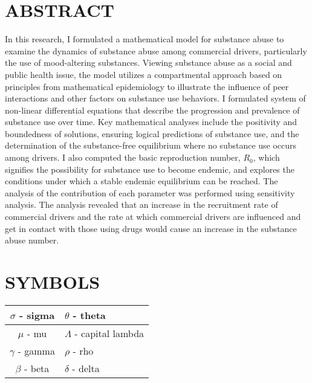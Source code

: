 \documentclass[12pt]{report}
\begin{document}
	
	
	\newpage
	
	\tableofcontents
	\section*{ABSTRACT}
		
	
In this research, I formulated a mathematical model for substance abuse to examine the dynamics of substance abuse among commercial drivers, particularly the use of mood-altering substances. Viewing substance abuse as a social and public health issue, the model utilizes a compartmental approach based on principles from mathematical epidemiology to illustrate the influence of peer interactions and other factors on substance use behaviors. I  formulated  system of non-linear differential equations that describe the progression and prevalence of substance use over time. 
Key mathematical analyses include the positivity and boundedness of solutions, ensuring logical predictions of substance use, and the determination of the substance-free equilibrium where no substance use occurs among drivers. I also computed the basic reproduction number, \( R_0 \), which signifies the possibility for substance use to become endemic, and explores the conditions under which a stable endemic equilibrium can be reached. The analysis of the contribution of each parameter was performed using sensitivity analysis. The analysis revealed that an increase in the recruitment rate of commercial drivers and the rate at which commercial drivers are influenced and get in contact with those using drugs would cause an increase in the substance abuse number.



	
	\newpage
	
	\section*{SYMBOLS}
	
	\begin{tabular}{|c|l|}
		
		\hline\textbf{$\sigma$} - sigma  & $\theta$ - theta \\
	\hline	$\mu$ - mu & $\Lambda$ - capital lambda \\
	\hline	$\gamma$ - gamma & $\rho$ - rho \\
	\hline	$\beta$ - beta & $\delta$ - delta \\\hline
	\end{tabular}
	
\end{document}
